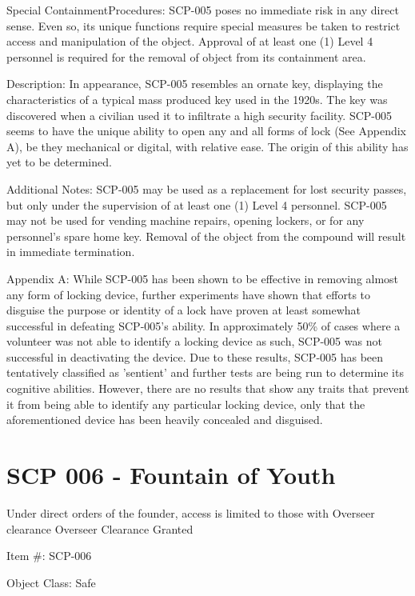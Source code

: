 \documentclass[a4paper, 11pt]{article}
\begin{document}
Special Containment\linebreak Procedures: SCP-005 poses no immediate risk in any direct sense. Even so, its unique functions require special measures be taken to restrict access and manipulation of the object. Approval of at least one (1) Level 4 personnel is required for the removal of object from its containment area.

Description: In appearance, SCP-005 resembles an ornate key, displaying the characteristics of a typical mass produced key used in the 1920s. The key was discovered when a civilian used it to infiltrate a high security facility. SCP-005 seems to have the unique ability to open any and all forms of lock (See Appendix A), be they mechanical or digital, with relative ease. The origin of this ability has yet to be determined.

Additional Notes: SCP-005 may be used as a replacement for lost security passes, but only under the supervision of at least one (1) Level 4 personnel. SCP-005 may not be used for vending machine repairs, opening lockers, or for any personnel's spare home key. Removal of the object from the compound will result in immediate termination.

Appendix A: While SCP-005 has been shown to be effective in removing almost any form of locking device, further experiments have shown that efforts to disguise the purpose or identity of a lock have proven at least somewhat successful in defeating SCP-005's ability. In approximately 50\% of cases where a volunteer was not able to identify a locking device as such, SCP-005 was not successful in deactivating the device. Due to these results, SCP-005 has been tentatively classified as 'sentient' and further tests are being run to determine its cognitive abilities. However, there are no results that show any traits that prevent it from being able to identify any particular locking device, only that the aforementioned device has been heavily concealed and disguised.

\section{SCP 006 - Fountain of Youth}
Under direct orders of the founder, access is limited to those with Overseer clearance
Overseer Clearance Granted

Item \#: SCP-006

Object Class: Safe
\end{document}
